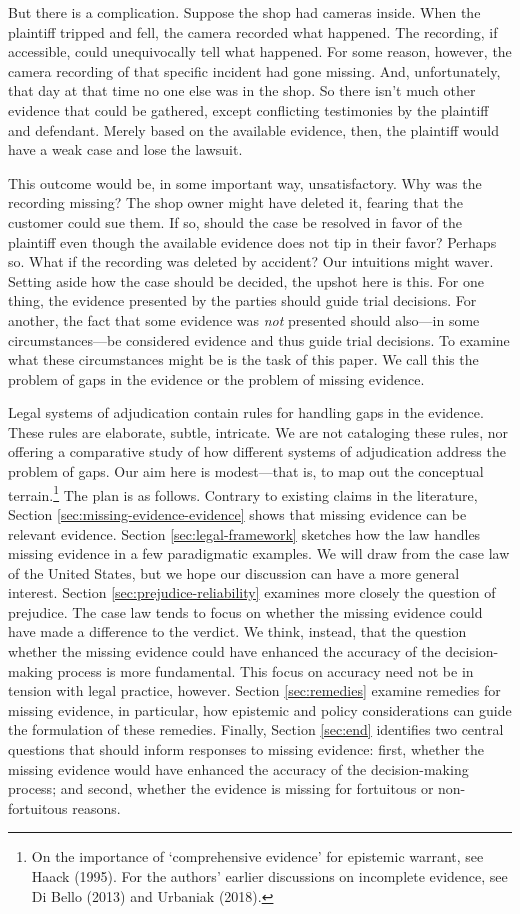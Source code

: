 \documentclass[
  10pt,
  dvipsnames,enabledeprecatedfontcommands]{scrartcl}
\begin{document}
But there is a complication. Suppose the shop had cameras inside. When
the plaintiff tripped and fell, the camera recorded what happened. The
recording, if accessible, could unequivocally tell what happened. For
some reason, however, the camera recording of that specific incident had
gone missing. And, unfortunately, that day at that time no one else was
in the shop. So there isn't much other evidence that could be gathered,
except conflicting testimonies by the plaintiff and defendant. Merely
based on the available evidence, then, the plaintiff would have a weak
case and lose the lawsuit.

This outcome would be, in some important way, unsatisfactory. Why was
the recording missing? The shop owner might have deleted it, fearing
that the customer could sue them. If so, should the case be resolved in
favor of the plaintiff even though the available evidence does not tip
in their favor? Perhaps so. What if the recording was deleted by
accident? Our intuitions might waver. Setting aside how the case should
be decided, the upshot here is this. For one thing, the evidence
presented by the parties should guide trial decisions. For another, the
fact that some evidence was \textit{not} presented should also---in some
circumstances---be considered evidence and thus guide trial decisions.
To examine what these circumstances might be is the task of this paper.
We call this the problem of gaps in the evidence or the problem of
missing evidence.

Legal systems of adjudication contain rules for handling gaps in the
evidence. These rules are elaborate, subtle, intricate. We are not
cataloging these rules, nor offering a comparative study of how
different systems of adjudication address the problem of gaps. Our aim
here is modest---that is, to map out the conceptual terrain.\footnote{On
  the importance of `comprehensive evidence' for epistemic warrant, see
  Haack (1995). For the authors' earlier discussions on incomplete
  evidence, see Di Bello (2013) and Urbaniak (2018).} The plan is as
follows. Contrary to existing claims in the literature, Section
\ref{sec:missing-evidence-evidence} shows that missing evidence can be
relevant evidence. Section \ref{sec:legal-framework} sketches how the
law handles missing evidence in a few paradigmatic examples. We will
draw from the case law of the United States, but we hope our discussion
can have a more general interest. Section
\ref{sec:prejudice-reliability} examines more closely the question of
prejudice. The case law tends to focus on whether the missing evidence
could have made a difference to the verdict. We think, instead, that the
question whether the missing evidence could have enhanced the accuracy
of the decision-making process is more fundamental. This focus on
accuracy need not be in tension with legal practice, however. Section
\ref{sec:remedies} examine remedies for missing evidence, in particular,
how epistemic and policy considerations can guide the formulation of
these remedies. Finally, Section \ref{sec:end} identifies two central
questions that should inform responses to missing evidence: first,
whether the missing evidence would have enhanced the accuracy of the
decision-making process; and second, whether the evidence is missing for
fortuitous or non-fortuitous reasons.
\end{document}
